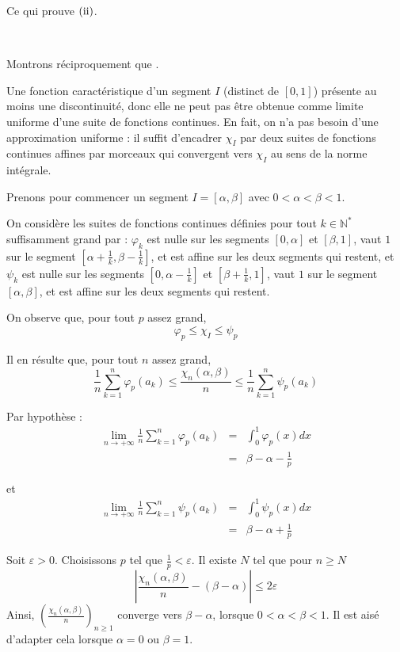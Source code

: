 Ce qui prouve $(\operatorname{ii})$.

\

Montrons r{\'e}ciproquement que .

Une fonction caract{\'e}ristique d'un segment $I$ (distinct de $[0, 1]$)
pr{\'e}sente au moins une discontinuit{\'e}, donc elle ne peut pas {\^e}tre
obtenue comme limite uniforme d'une suite de fonctions continues. En fait, on
n'a pas besoin d'une approximation uniforme : il suffit d'encadrer $\chi_I$
par deux suites de fonctions continues affines par morceaux qui convergent
vers $\chi_I$ au sens de la norme int{\'e}grale.

Prenons pour commencer un segment $I = [\alpha, \beta]$ avec $0 < \alpha <
\beta < 1$.

On consid{\`e}re les suites de fonctions continues d{\'e}finies pour tout $k
\in \mathbb{N}^{\ast}$ suffisamment grand par : $\varphi_k$ est nulle sur les
segments $[0, \alpha]$ et $[\beta, 1]$, vaut $1$ sur le segment $\left[ \alpha
+ \frac{1}{k}, \beta - \frac{1}{k} \right]$, et est affine sur les deux
segments qui restent, et $\psi_k$ est nulle sur les segments $\left[ 0, \alpha
- \frac{1}{k}  \right]$ et $\left[ \beta + \frac{1}{k}, 1 \right]$, vaut $1$
sur le segment $[\alpha, \beta]$, et est affine sur les deux segments qui
restent.

On observe que, pour tout $p$ assez grand,
\[ \varphi_p \leq \chi_I \leq \psi_p \]


Il en r{\'e}sulte que, pour tout $n$ assez grand,
\[ \frac{1}{n}  \sum_{k = 1}^n \varphi_p (a_k) \leq \frac{\chi_n (\alpha,
   \beta)}{n} \leq \frac{1}{n}  \sum_{k = 1}^n \psi_p (a_k) \]


Par hypoth{\`e}se :
\begin{eqnarray*}
  \underset{n \to + \infty}{\lim}   \frac{1}{n}  \sum_{k = 1}^n \varphi_p
  (a_k) & = & \int_0^1 \varphi_p (x) dx\\
  & = & \beta - \alpha - \frac{1}{p}
\end{eqnarray*}


et
\begin{eqnarray*}
  \lim_{n \to + \infty}  \frac{1}{n}  \sum_{k = 1}^n \psi_p (a_k) & = &
  \int_0^1 \psi_p (x) dx\\
  & = & \beta - \alpha + \frac{1}{p}
\end{eqnarray*}


Soit $\varepsilon > 0$. Choisissons $p$ tel que $\frac{1}{p} < \varepsilon$.
Il existe $N$ tel que pour $n \geq N$
\[ \left| \frac{\chi_n (\alpha, \beta)}{n} - (\beta - \alpha) \right| \leq 2
   \varepsilon \]
Ainsi, $\left( \frac{\chi_n (\alpha, \beta)}{n} \right)_{n \geq 1}$ converge
vers $\beta - \alpha$, lorsque $0 < \alpha < \beta < 1$. Il est ais{\'e}
d'adapter cela lorsque $\alpha = 0$ ou $\beta = 1$.


